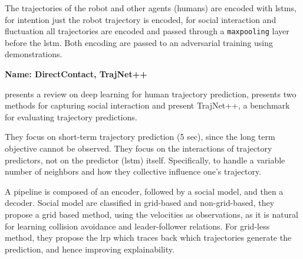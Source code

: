 The trajectories of the robot and other agents (humans) are encoded with \glspl{lstm}, for intention just the robot trajectory is encoded, for social interaction and fluctuation all trajectories are encoded and passed through a \texttt{maxpooling} layer before the \gls{lstm}.
%
Both encoding are passed to an adversarial training using demonstrations.



\cite{cui2021learning}


\cite{kiss2021probabilistic}


\cite{xu2021tra2tra}


\textbf{Name: DirectContact, TrajNet++}

\cite{kothari2021human} presents a review on deep learning for human trajectory prediction, presents two methods for capturing social interaction and present TrajNet++, a benchmark for evaluating trajectory predictions. 

They focus on short-term trajectory prediction (5 sec), since the long term objective cannot be observed.
%
They focus on the interactions of trajectory predictors, not on the predictor (\gls{lstm}) itself.
%
Specifically, to handle a variable number of neighbors and how they collective influence one's trajectory.

A pipeline is composed of an encoder, followed by a social model, and then a decoder.
%
Social model are classified in grid-based and non-grid-based, they propose a grid based method, using the velocities as observations, as it is natural for learning collision avoidance and leader-follower relations.
%
For grid-less method, they propose the \gls{lrp} which traces back which trajectories generate the prediction, and hence improving explainability.



